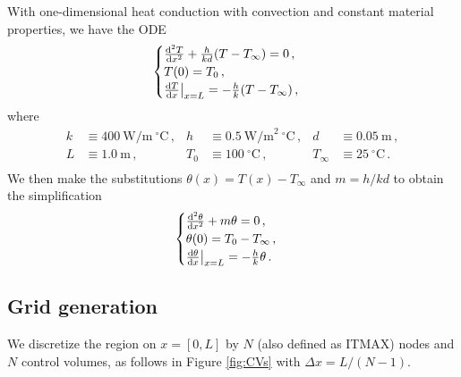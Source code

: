 \documentclass{article}
\begin{document}
With one-dimensional heat conduction with convection and constant material properties, we have the ODE
\begin{equation}
	\begin{cases}
		\dv{^2T}{x^2} + \frac{h}{kd} (T - T_\infty) = 0\,,\\
		T(0) = T_0\,,\\
		\dv{T}{x} \big|_{x = L} = - \frac{h}{k} (T - T_\infty)\,,
	\end{cases}
\end{equation}
where
\begin{align*}
	k & \equiv 400~\text{W/m}~^\circ\text{C}\,, & h & \equiv 0.5~\text{W/m}^2~^\circ\text{C}\,, & d & \equiv 0.05~\text{m}\,,\\
	L & \equiv 1.0~\text{m}\,, & T_0 & \equiv 100~^\circ\text{C}\,, & T_\infty & \equiv 25~^\circ\text{C}\,.\\ 
\end{align*}
We then make the substitutions $\theta(x) = T(x) - T_\infty$ and $m = h/kd$ to obtain the simplification
\begin{equation}
	\begin{cases}
		\dv{^2\theta}{x^2} + m \theta = 0\,,\\
		\theta(0) = T_0 - T_\infty\,,\\
		\dv{\theta}{x} \big|_{x = L} = - \frac{h}{k} \theta\,.
	\end{cases}
	\end{equation}
	
\subsection*{Grid generation}

We discretize the region on $x = [0, L]$ by $N$ (also defined as ITMAX) nodes and $N$ control volumes, as follows in Figure \ref{fig:CVs} with $\Delta x = L / (N - 1)$.
\end{document}
